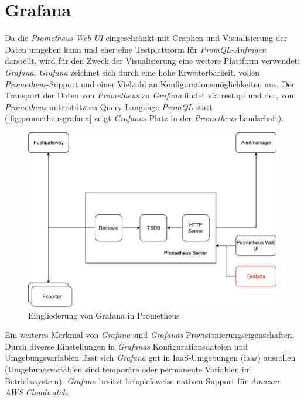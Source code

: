 \documentclass[titlepage]{report}
\begin{document}
\section{Grafana}
Da die \emph{Prometheus Web UI} eingeschränkt mit Graphen und
Visualisierung der Daten umgehen kann und eher eine Testplattform für
\emph{PromQL-Anfragen} darstellt, wird für den Zweck der
Visualisierung eine weitere Plattform verwendet:
\emph{Grafana}\cite{GRAFANA}. \emph{Grafana} zeichnet sich durch eine
hohe Erweiterbarkeit, vollen \emph{Prometheus}\hyp{}Support und einer
Vielzahl an Konfigurationsmöglichkeiten aus. Der Transport der Daten von
\emph{Prometheus} zu \emph{Grafana} findet via \gls{restapi} und der, von
\emph{Prometheus} unterstützten Query\hyp{}Language \emph{PromQL} statt
(\autoref{fig:prometheusgrafana} zeigt \emph{Grafanas} Platz in der
\emph{Prometheus}\hyp{}Landschaft).
\begin{figure}[H]
    \centering
    \includegraphics[width=1.0\textwidth]{figures/prometheus_grafana.pdf}
    \caption{Eingliederung von Grafana in Prometheus}\label{fig:prometheusgrafana}
\end{figure}
Ein weiteres Merkmal von \emph{Grafana} sind \emph{Grafanas}
Provisionierungseigenschaften. Durch diverse Einstellungen in
\emph{Grafanas} Konfigurationsdateien und Umgebungsvariablen lässt sich
\emph{Grafana} gut in IaaS\hyp{}Umgebungen (\gls{iaas})
ausrollen (Umgebungsvariablen sind temporäre oder permanente Variablen im
Betriebssystem)\cite[Beispiel zum Deployment von Grafana in Amazon
AWS]{GRAFANA_AWS_DEPLOYMENT}. \emph{Grafana} besitzt beispielsweise nativen
Support für \emph{Amazon AWS Cloudwatch}\cite{GRAFANA_CLOUDWATCH}.
\end{document}
